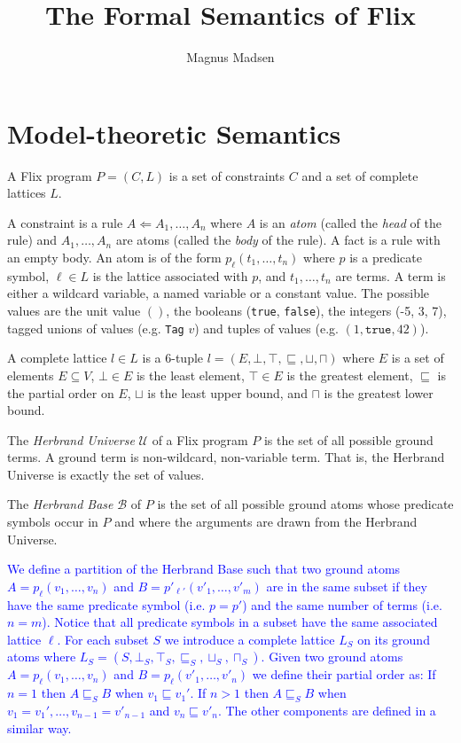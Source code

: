 \documentclass[10pt,twocolumn]{article}
\title{The Formal Semantics of Flix}
\author{Magnus Madsen}
\date{}
\begin{document}
\maketitle

\section{Model-theoretic Semantics}

A Flix program $P = (C, L)$ is a set of constraints $C$ and a set of complete lattices $L$.

A constraint is a rule $A \Leftarrow A_1, \dots, A_n$ 
where $A$ is an \emph{atom} (called the \emph{head} of the rule) 
and $A_1, \dots, A_n$ are atoms (called the \emph{body} of the rule).
A fact is a rule with an empty body.
An atom is of the form $p_\ell(t_1, \dots, t_n)$ where 
$p$ is a predicate symbol,
$\ell \in L$ is the lattice associated with $p$, and
$t_1, \dots, t_n$ are terms. 
A term is either a wildcard variable, a named variable or a constant value. 
The possible values are the unit value $()$, the booleans (\texttt{true}, \texttt{false}),
the integers (-5, 3, 7), tagged unions of values (e.g. \texttt{Tag} $v$) and 
tuples of values (e.g. $(1, \texttt{true}, 42)$).

A complete lattice $l \in L$ is a 6-tuple $l = (E, \bot, \top, \sqsubseteq, \sqcup, \sqcap)$ where 
$E$ is a set of elements $E \subseteq V$,
$\bot \in E$ is the least element,
$\top \in E$ is the greatest element,
$\sqsubseteq$ is the partial order on $E$,
$\sqcup$ is the least upper bound, and
$\sqcap$ is the greatest lower bound.

The \emph{Herbrand Universe} $\mathcal{U}$ of a Flix program $P$ is the set of all possible ground terms.
A ground term is non-wildcard, non-variable term. That is, the Herbrand Universe is exactly the set of values.

The \emph{Herbrand Base} $\mathcal{B}$ of $P$ is the set of all possible ground atoms whose
predicate symbols occur in $P$ and where the arguments are drawn from the Herbrand Universe.

\textcolor{blue}{
We define a partition of the Herbrand Base such that two ground atoms 
$A = p_\ell(v_1, \dots, v_n)$ and $B = p'_{\ell'}(v'_1, \dots, v'_m)$ are in the same subset
if they have the same predicate symbol (i.e. $p = p'$) and the same number of terms (i.e. $n = m$).
Notice that all predicate symbols in a subset have the same associated lattice $\ell$.
For each subset $S$ we introduce a complete lattice $L_S$ on its ground atoms 
where $L_S = (S, \bot_S, \top_S, \sqsubseteq_S, \sqcup_S, \sqcap_S)$.
Given two ground atoms $A = p_\ell(v_1, \dots, v_n)$ and $B = p_\ell(v'_1, \dots, v'_n)$ we define their partial order as:
If $n = 1$ then $A \sqsubseteq_S B$ when $v_1 \sqsubseteq v_1'$.
If $n > 1$ then $A \sqsubseteq_S B$ when $v_1 = v_1', \dots, v_{n - 1} = v'_{n - 1}$ and $v_n \sqsubseteq v'_n$.
The other components are defined in a similar way.
}
\end{document}
